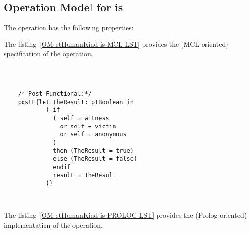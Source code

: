 \subsection{Operation Model for is}

\label{OM-is}


The  operation has the following properties:

	\begin{operationmodel}



		


	\end{operationmodel}



	\vspace{1cm}
	The listing~\ref{OM-etHumanKind-is-MCL-LST} provides the \msrmessir (MCL-oriented) specification of the operation.
	
	\scriptsize
	\vspace{0.5cm}
	\begin{lstlisting}[style=MessirStyle,firstnumber=auto,captionpos=b,caption={\msrmessir (MCL-oriented) specification of the operation \emph{is}.},label=OM-etHumanKind-is-MCL-LST]

	
	
	/* Post Functional:*/ 
	postF{let TheResult: ptBoolean in
	        ( if
	          ( self = witness
	            or self = victim
	            or self = anonymous
	          )
	          then (TheResult = true)
	          else (TheResult = false)
	          endif
	          result = TheResult
	        )}
	
	
	\end{lstlisting}
	\normalsize 
	
	
	
	
	
	\vspace{1cm}
	The listing~\ref{OM-etHumanKind-is-PROLOG-LST} provides the \msrmessir (Prolog-oriented) implementation of the operation.
	
	\scriptsize
	\vspace{0.5cm}
	
	
	\normalsize





